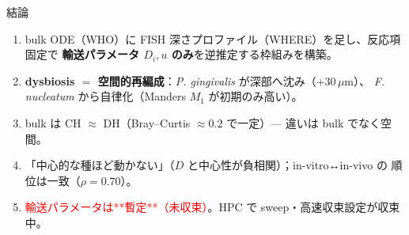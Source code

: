 \documentclass[
  ignorenonframetext,
  aspectratio=169,
]{beamer}
\providecommand{\tightlist}{%
  \setlength{\itemsep}{0pt}\setlength{\parskip}{0pt}}
\begin{document}
\begin{frame}{結論}
\protect\hypertarget{ux7d50ux8ad6}{}
\begin{enumerate}
\tightlist
\item
  bulk ODE（WHO）に FISH 深さプロファイル（WHERE）を足し、反応項固定で
  \textbf{輸送パラメータ \(D_i,u\) のみ}を逆推定する枠組みを構築。
\item
  \textbf{dysbiosis \(=\) 空間的再編成}：\emph{P. gingivalis}
  が深部へ沈み（\(+30\,\mu\mathrm{m}\)）、 \emph{F. nucleatum}
  から自律化（Manders \(M_1\) が初期のみ高い）。
\item
  bulk は CH \(\approx\) DH（Bray--Curtis \(\approx0.2\) で一定）---
  違いは bulk でなく空間。
\item
  「中心的な種ほど動かない」（\(D\) と中心性が負相関）；in-vitro↔in-vivo
  の 順位は一致（\(\rho=0.70\)）。
\item
  \textcolor{red}{輸送パラメータは**暫定**（未収束）}。HPC で
  sweep・高速収束設定が収束中。
\end{enumerate}
\end{frame}
\end{document}
